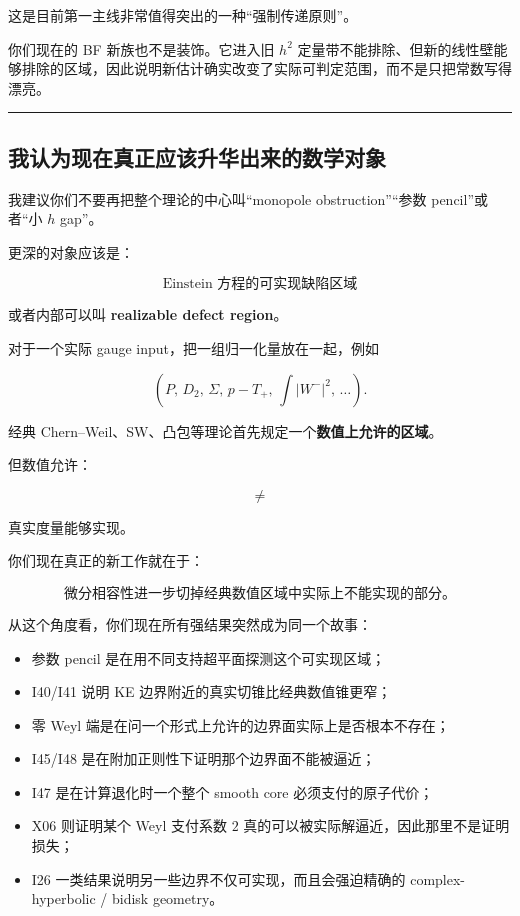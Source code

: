 \documentclass[
  10pt,
]{article}
\providecommand{\tightlist}{%
  \setlength{\itemsep}{0pt}\setlength{\parskip}{0pt}}
\begin{document}
这是目前第一主线非常值得突出的一种``强制传递原则''。

你们现在的 BF 新族也不是装饰。它进入旧 \(h^2\)
定量带不能排除、但新的线性壁能够排除的区域，因此说明新估计确实改变了实际可判定范围，而不是只把常数写得漂亮。

\begin{center}\rule{0.5\linewidth}{0.5pt}\end{center}

\hypertarget{ux6211ux8ba4ux4e3aux73b0ux5728ux771fux6b63ux5e94ux8be5ux5347ux534eux51faux6765ux7684ux6570ux5b66ux5bf9ux8c61}{%
\subsection{我认为现在真正应该升华出来的数学对象}\label{ux6211ux8ba4ux4e3aux73b0ux5728ux771fux6b63ux5e94ux8be5ux5347ux534eux51faux6765ux7684ux6570ux5b66ux5bf9ux8c61}}

我建议你们不要再把整个理论的中心叫``monopole obstruction''``参数
pencil''或者``小 \(h\) gap''。

更深的对象应该是：

\[
\boxed{\text{Einstein 方程的可实现缺陷区域}}
\]

或者内部可以叫 \textbf{realizable defect region}。

对于一个实际 gauge input，把一组归一化量放在一起，例如

\[
\left(
P,\,
D_2,\,
\Sigma,\,
p-T_+,\,
\int|W^-|^2,\,
\ldots
\right).
\]

经典 Chern--Weil、SW、凸包等理论首先规定一个\textbf{数值上允许的区域}。

但数值允许：

\[
\neq
\]

真实度量能够实现。

你们现在真正的新工作就在于：

\[
\boxed{
\text{微分相容性进一步切掉经典数值区域中实际上不能实现的部分。}
}
\]

从这个角度看，你们现在所有强结果突然成为同一个故事：

\begin{itemize}
\tightlist
\item
  参数 pencil 是在用不同支持超平面探测这个可实现区域；
\item
  I40/I41 说明 KE 边界附近的真实切锥比经典数值锥更窄；
\item
  零 Weyl 端是在问一个形式上允许的边界面实际上是否根本不存在；
\item
  I45/I48 是在附加正则性下证明那个边界面不能被逼近；
\item
  I47 是在计算退化时一个整个 smooth core 必须支付的原子代价；
\item
  X06 则证明某个 Weyl 支付系数 \(2\)
  真的可以被实际解逼近，因此那里不是证明损失；
\item
  I26 一类结果说明另一些边界不仅可实现，而且会强迫精确的
  complex-hyperbolic / bidisk geometry。
\end{itemize}
\end{document}
